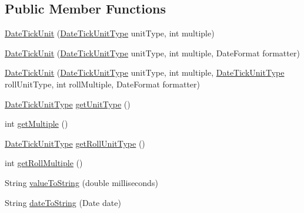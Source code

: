 \subsection*{Public Member Functions}
\begin{DoxyCompactItemize}
\item 
\mbox{\hyperlink{classorg_1_1jfree_1_1chart_1_1axis_1_1_date_tick_unit_a900b9f19584c2bbc89da92c80b16539a}{Date\+Tick\+Unit}} (\mbox{\hyperlink{classorg_1_1jfree_1_1chart_1_1axis_1_1_date_tick_unit_type}{Date\+Tick\+Unit\+Type}} unit\+Type, int multiple)
\item 
\mbox{\hyperlink{classorg_1_1jfree_1_1chart_1_1axis_1_1_date_tick_unit_a065e0304a5da197ed411f8e647d9faad}{Date\+Tick\+Unit}} (\mbox{\hyperlink{classorg_1_1jfree_1_1chart_1_1axis_1_1_date_tick_unit_type}{Date\+Tick\+Unit\+Type}} unit\+Type, int multiple, Date\+Format formatter)
\item 
\mbox{\hyperlink{classorg_1_1jfree_1_1chart_1_1axis_1_1_date_tick_unit_a5ff8cc0029fe9bfa1ef6554bbbe3e98b}{Date\+Tick\+Unit}} (\mbox{\hyperlink{classorg_1_1jfree_1_1chart_1_1axis_1_1_date_tick_unit_type}{Date\+Tick\+Unit\+Type}} unit\+Type, int multiple, \mbox{\hyperlink{classorg_1_1jfree_1_1chart_1_1axis_1_1_date_tick_unit_type}{Date\+Tick\+Unit\+Type}} roll\+Unit\+Type, int roll\+Multiple, Date\+Format formatter)
\item 
\mbox{\hyperlink{classorg_1_1jfree_1_1chart_1_1axis_1_1_date_tick_unit_type}{Date\+Tick\+Unit\+Type}} \mbox{\hyperlink{classorg_1_1jfree_1_1chart_1_1axis_1_1_date_tick_unit_a5fcf378adb505a306a48a79dad997772}{get\+Unit\+Type}} ()
\item 
int \mbox{\hyperlink{classorg_1_1jfree_1_1chart_1_1axis_1_1_date_tick_unit_a318953fca38873f272ba969ba7547eba}{get\+Multiple}} ()
\item 
\mbox{\hyperlink{classorg_1_1jfree_1_1chart_1_1axis_1_1_date_tick_unit_type}{Date\+Tick\+Unit\+Type}} \mbox{\hyperlink{classorg_1_1jfree_1_1chart_1_1axis_1_1_date_tick_unit_a319b0105aedad327b40ad344007cff8c}{get\+Roll\+Unit\+Type}} ()
\item 
int \mbox{\hyperlink{classorg_1_1jfree_1_1chart_1_1axis_1_1_date_tick_unit_af03898b2b6fb14ebfce9bee5973951d7}{get\+Roll\+Multiple}} ()
\item 
String \mbox{\hyperlink{classorg_1_1jfree_1_1chart_1_1axis_1_1_date_tick_unit_aac7c51829f8ace61a2a9d4e72266bcf9}{value\+To\+String}} (double milliseconds)
\item 
String \mbox{\hyperlink{classorg_1_1jfree_1_1chart_1_1axis_1_1_date_tick_unit_ae26d7a9d613ab18d6dad3860e6da5885}{date\+To\+String}} (Date date)

\end{DoxyCompactItemize}
